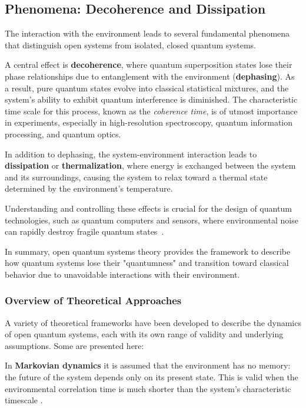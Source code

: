 \subsection{Phenomena: Decoherence and Dissipation}
\label{subsec:phenomena_decoherence_dissipation}

\noindent
The interaction with the environment leads to several fundamental phenomena that distinguish open systems from isolated, closed quantum systems.

\noindent
A central effect is \textbf{decoherence}, where quantum superposition states lose their phase relationships due to entanglement with the environment (\textbf{dephasing}). As a result, pure quantum states evolve into classical statistical mixtures, and the system's ability to exhibit quantum interference is diminished. The characteristic time scale for this process, known as the \emph{coherence time}, is of utmost importance in experiments, especially in high-resolution spectroscopy, quantum information processing, and quantum optics.

\noindent
In addition to dephasing, the system-environment interaction leads to \textbf{dissipation} or \textbf{thermalization}, where energy is exchanged between the system and its surroundings, causing the system to relax toward a thermal state determined by the environment's temperature.

\noindent
Understanding and controlling these effects is crucial for the design of quantum technologies, such as quantum computers and sensors, where environmental noise can rapidly destroy fragile quantum states~\cite{laddetal2010quantumcomputers}.  

\noindent
In summary, open quantum systems theory provides the framework to describe how quantum systems lose their "quantumness" and transition toward classical behavior due to unavoidable interactions with their environment.


\subsubsection{Overview of Theoretical Approaches}
\label{subsec:overview_theoretical_approaches_oqs}

\noindent
A variety of theoretical frameworks have been developed to describe the dynamics of open quantum systems, each with its own range of validity and underlying assumptions. Some are presented here:

\noindent
In \textbf{Markovian dynamics} it is assumed that the environment has no memory: the future of the system depends only on its present state. This is valid when the environmental correlation time is much shorter than the system's characteristic timescale . 

